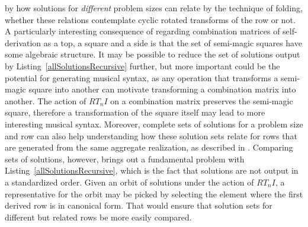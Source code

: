 by how solutions for \emph{different} problem sizes can relate by the technique of folding, whether these relations contemplate cyclic rotated transforms of the row or not. A particularly interesting consequence of regarding combination matrices of self-derivation as a top, a square and a side is that the set of semi-magic squares have some algebraic structure. It may be possible to reduce the set of solutions output by Listing~\ref{allSolutionsRecursive} further, but more important could be the potential for generating musical syntax, as any operation that transforms a semi-magic square into another can motivate transforming a combination matrix into another. The action of $RT_nI$ on a combination matrix preserves the semi-magic square, therefore a transformation of the square itself may lead to more interesting musical syntax. Moreover, complete sets of solutions for a problem size and row can also help understanding how these solution sets relate for rows that are generated from the same aggregate realization, as described in \cite{Starr1984}. Comparing sets of solutions, however, brings out a fundamental problem with Listing~\ref{allSolutionsRecursive}, which is the fact that solutions are not output in a standardized order. Given an orbit of solutions under the action of $RT_nI$, a representative for the orbit may be picked by selecting the element where the first derived row is in canonical form. That would ensure that solution sets for different but related rows be more easily compared.

